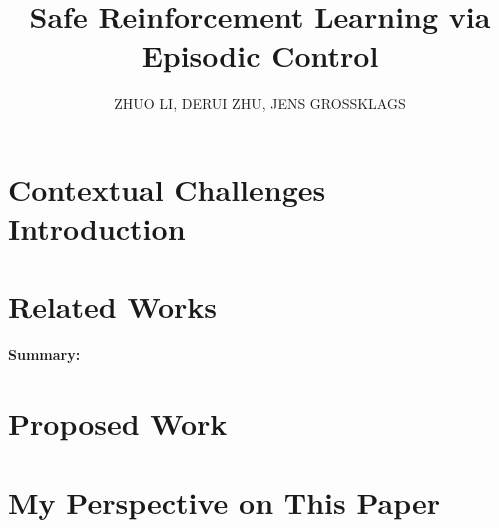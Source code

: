 \documentclass[9pt,a4paper,twocolumn,twoside]{tau-class/tau}
\title{Safe Reinforcement Learning via Episodic Control}
\author{ZHUO LI, DERUI ZHU, JENS GROSSKLAGS}
\begin{document}
		
    \maketitle 
    \thispagestyle{firststyle} 
    \tauabstract 
    

\section{Contextual Challenges Introduction}


\section{Related Works}


\textbf{Summary:}
\section{Proposed Work}

    
\section{My Perspective on This Paper}


%
\end{document}
